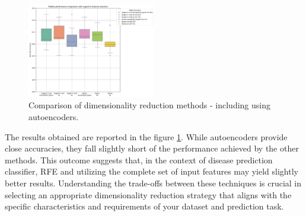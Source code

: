 \begin{figure}[h!]
    \includegraphics[width=0.5\textwidth]{figures/autoencoders_results.png}
    \caption{Comparison of dimensionality reduction methods - including using autoencoders.}
    \label{fig:autoencoders}
    \Description{}
\end{figure}
 
The results obtained are reported in the figure \ref{fig:autoencoders}. While autoencoders provide close accuracies, they fall slightly short of the performance achieved by the other methods. This outcome suggests that, in the context of disease prediction classifier, RFE and utilizing the complete set of input features may yield slightly better results. Understanding the trade-offs between these techniques is crucial in selecting an appropriate dimensionality reduction strategy that aligns with the specific characteristics and requirements of your dataset and prediction task.


